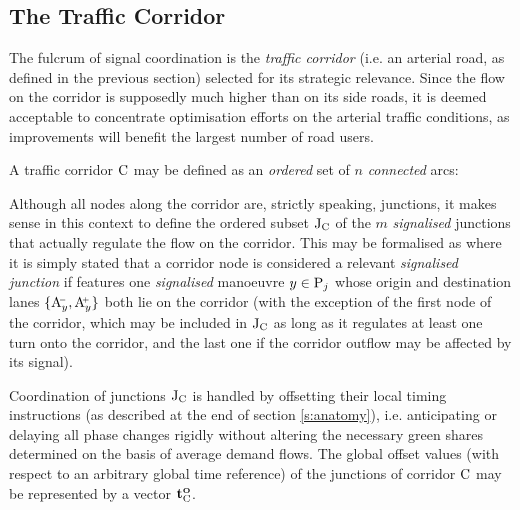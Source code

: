 \subsection{The Traffic Corridor} \label{s:corridor}
The fulcrum of signal coordination is the \emph{traffic corridor} (i.e. an arterial road, as defined in the previous section) selected for its strategic relevance. Since the flow on the corridor is supposedly much higher than on its side roads, it is deemed acceptable to concentrate optimisation efforts on the arterial traffic conditions, as improvements will benefit the largest number of road users.

A traffic corridor $\mathrm{C}$ may be defined as an \emph{ordered} set of $n$ \emph{connected} arcs:

Although all nodes along the corridor are, strictly speaking, junctions, it makes sense in this context to define the ordered subset $\mathrm{J}_{\mathrm{C}}$ of the $m$ \emph{signalised} junctions that actually regulate the flow on the corridor.
This may be formalised as
where it is simply stated that a corridor node is considered a relevant \emph{signalised junction} if features one \emph{signalised} manoeuvre $y \in \mathrm{P}_j$ whose origin and destination lanes $\{\mathrm{A}_{y}^{\scriptscriptstyle{\hspace{-2pt}-}}, \mathrm{A}_{y}^{\scriptscriptstyle{\hspace{-2pt}+}}\}$ both lie on the corridor (with the exception of the first node of the corridor, which may be included in $\mathrm{J}_{\mathrm{C}}$ as long as it regulates at least one turn onto the corridor, and the last one if the corridor outflow may be affected by its signal).

Coordination of junctions $\mathrm{J}_{\mathrm{C}}$ is handled by offsetting their local timing instructions (as described at the end of section \ref{s:anatomy}), i.e. anticipating or delaying all phase changes rigidly without altering the necessary green shares determined on the basis of average demand flows.
The global offset values (with respect to an arbitrary global time reference) of the junctions of corridor $\mathrm{C}$ may be represented by a vector $\mathbf{t}_{\mathrm{C}}^{\mathbf{\scriptscriptstyle{O}}}$.


